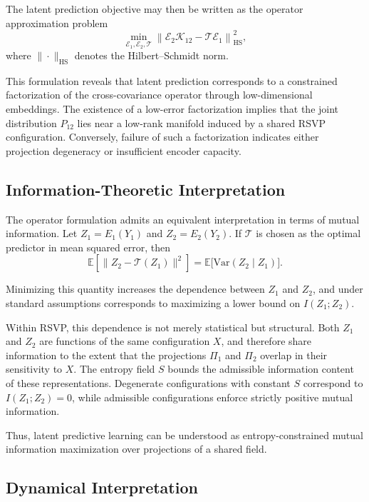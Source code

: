 \documentclass[12pt, oneside]{article}
\begin{document}
The latent prediction objective may then be written as the operator approximation problem
\[
\min_{\mathcal{E}_1, \mathcal{E}_2, \mathcal{T}}
\left\|
\mathcal{E}_2 \mathcal{K}_{12} - \mathcal{T} \mathcal{E}_1
\right\|_{\mathrm{HS}}^2,
\]
where $\|\cdot\|_{\mathrm{HS}}$ denotes the Hilbert--Schmidt norm.

This formulation reveals that latent prediction corresponds to a constrained factorization of the cross-covariance operator through low-dimensional embeddings. The existence of a low-error factorization implies that the joint distribution $P_{12}$ lies near a low-rank manifold induced by a shared RSVP configuration. Conversely, failure of such a factorization indicates either projection degeneracy or insufficient encoder capacity.

\subsection{Information-Theoretic Interpretation}

The operator formulation admits an equivalent interpretation in terms of mutual information. Let $Z_1 = E_1(Y_1)$ and $Z_2 = E_2(Y_2)$. If $\mathcal{T}$ is chosen as the optimal predictor in mean squared error, then
\[
\mathbb{E}\left[\|Z_2 - \mathcal{T}(Z_1)\|^2\right]
= \mathbb{E}\big[\mathrm{Var}(Z_2 \mid Z_1)\big].
\]

Minimizing this quantity increases the dependence between $Z_1$ and $Z_2$, and under standard assumptions corresponds to maximizing a lower bound on $I(Z_1; Z_2)$.

Within RSVP, this dependence is not merely statistical but structural. Both $Z_1$ and $Z_2$ are functions of the same configuration $X$, and therefore share information to the extent that the projections $\Pi_1$ and $\Pi_2$ overlap in their sensitivity to $X$. The entropy field $S$ bounds the admissible information content of these representations. Degenerate configurations with constant $S$ correspond to $I(Z_1;Z_2)=0$, while admissible configurations enforce strictly positive mutual information.

Thus, latent predictive learning can be understood as entropy-constrained mutual information maximization over projections of a shared field.

\subsection{Dynamical Interpretation}
\end{document}
